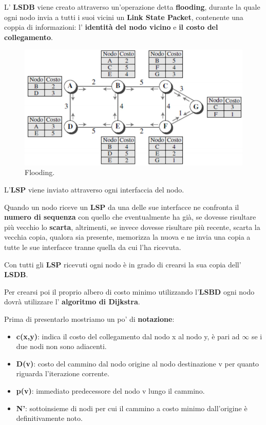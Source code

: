 \documentclass[11pt,a4paper,oneside]{book}
\theoremstyle{definition}
\begin{document}
\pagebreak

L' \textbf{LSDB} viene creato attraverso un'operazione detta \textbf{flooding}, durante la quale ogni nodo invia a tutti i suoi vicini un \textbf{Link State Packet}, contenente una coppia di informazioni: l' \textbf{identità del nodo vicino} e \textbf{il costo del collegamento}.

\begin{figure}[!h]
	\centering
	\includegraphics[scale=0.45]{Immagini/Flooding.png}
	\caption{Flooding.}
\end{figure}


L'\textbf{LSP} viene inviato attraverso ogni interfaccia del nodo.

Quando un nodo riceve un \textbf{LSP} da una delle sue interfacce ne confronta il \textbf{numero di sequenza} con quello che eventualmente ha già, se dovesse risultare più vecchio lo \textbf{scarta}, altrimenti, se invece dovesse risultare più recente, scarta la vecchia copia, qualora sia presente, memorizza la nuova e ne invia una copia a tutte le sue interfacce tranne quella da cui l'ha ricevuta.

Con tutti gli \textbf{LSP} ricevuti ogni nodo è in grado di crearsi la sua copia dell' \textbf{LSDB}.

Per crearsi poi il proprio albero di costo minimo utilizzando l'\textbf{LSBD} ogni nodo dovrà utilizzare l' \textbf{algoritmo di Dijkstra}.

Prima di presentarlo mostriamo un po' di \textbf{notazione}:
\begin{itemize}
	\item \textbf{c(x,y)}: indica il costo del collegamento dal nodo x al
	      nodo y, è pari ad $\infty$ se i due nodi non sono adiacenti.
	\item \textbf{D(v)}: costo del cammino dal nodo origine al nodo
	      destinazione v per quanto riguarda l’iterazione corrente.
	\item \textbf{p(v)}: immediato predecessore del nodo v lungo il
	      cammino.
	\item \textbf{N'}: sottoinsieme di nodi per cui il cammino a
	      costo minimo dall’origine è definitivamente noto.
\end{itemize}
\end{document}
